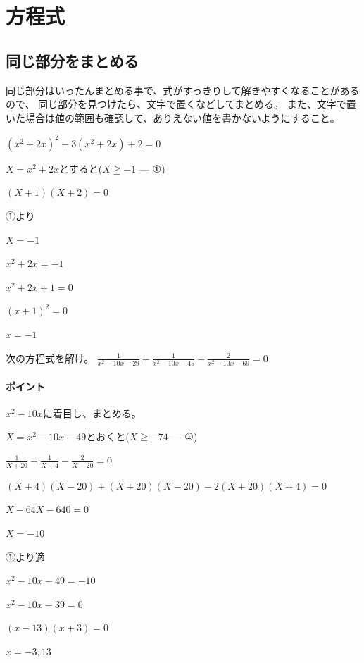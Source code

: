 \documentclass[uplatex,dvipdfmx]{jsbook}
\begin{document}
\section{方程式}
\subsection{同じ部分をまとめる}
同じ部分はいったんまとめる事で、式がすっきりして解きやすくなることがあるので、
同じ部分を見つけたら、文字で置くなどしてまとめる。
また、文字で置いた場合は値の範囲も確認して、ありえない値を書かないようにすること。

\begin{problem}[例題]
    $\left(x^2+2x\right)^2+3\left(x^2+2x\right)+2=0$

    $X=x^2+2x$とすると($X\geqq-1$ --- ①)

    $\left(X+1\right)\left(X+2\right)=0$

    ①より

    $X=-1$

    $x^2+2x=-1$

    $x^2+2x+1=0$

    $\left(x+1\right)^2=0$

    $x=-1$
\end{problem}

\begin{problem}[練習問題]
    次の方程式を解け。
    $\displaystyle\frac{1}{x^2-10x-29}+\frac{1}{x^2-10x-45}-\frac{2}{x^2-10x-69}=0$
\end{problem}

\paragraph{ポイント}$x^2-10x$に着目し、まとめる。


\begin{answer}
    $X=x^2-10x-49$とおくと($X\geqq-74$ --- ①)

    $\displaystyle \frac{1}{X+20}+\frac{1}{X+4}-\frac{2}{X-20}=0$

    $\left(X+4\right)\left(X-20\right)+\left(X+20\right)\left(X-20\right)-2\left(X+20\right)\left(X+4\right)=0$

    $X-64X-640=0$

    $X=-10$

    ①より適

    $x^2-10x-49=-10$

    $x^2-10x-39=0$

    $\left(x-13\right)\left(x+3\right)=0$

    $x=-3,13$
\end{answer}
\end{document}
